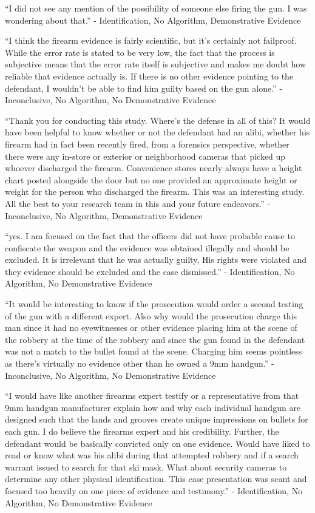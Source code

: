 \documentclass[print]{nuthesis}
\begin{document}
``I did not see any mention of the possibility of someone else firing the gun. I was wondering about that.'' - Identification, No Algorithm, Demonstrative Evidence

``I think the firearm evidence is fairly scientific, but it's certainly not failproof. While the error rate is stated to be very low, the fact that the process is subjective means that the error rate itself is subjective and makes me doubt how reliable that evidence actually is. If there is no other evidence pointing to the defendant, I wouldn't be able to find him guilty based on the gun alone.'' - Inconclusive, No Algorithm, No Demonstrative Evidence

``Thank you for conducting this study. Where's the defense in all of this? It would have been helpful to know whether or not the defendant had an alibi, whether his firearm had in fact been recently fired, from a forensics perspective, whether there were any in-store or exterior or neighborhood cameras that picked up whoever discharged the firearm. Convenience stores nearly always have a height chart posted alongside the door but no one provided an approximate height or weight for the person who discharged the firearm. This was an interesting study. All the best to your research team in this and your future endeavors.'' - Inconclusive, No Algorithm, Demonstrative Evidence

``yes. I am focused on the fact that the officers did not have probable cause to confiscate the weapon and the evidence was obtained illegally and should be excluded. It is irrelevant that he was actually guilty, His rights were violated and they evidence should be excluded and the case dismissed.'' - Identification, No Algorithm, No Demonstrative Evidence

``It would be interesting to know if the prosecution would order a second testing of the gun with a different expert. Also why would the prosecution charge this man since it had no eyewitnesses or other evidence placing him at the scene of the robbery at the time of the robbery and since the gun found in the defendant was not a match to the bullet found at the scene. Charging him seems pointless as there's virtually no evidence other than he owned a 9mm handgun.'' - Inconclusive, No Algorithm, No Demonstrative Evidence

``I would have like another firearms expert testify or a representative from that 9mm handgun manufacturer explain how and why each individual handgun are designed such that the lands and grooves create unique impressions on bullets for each gun. I do believe the firearms expert and his credibility. Further, the defendant would be basically convicted only on one evidence. Would have liked to read or know what was his alibi during that attempted robbery and if a search warrant issued to search for that ski mask. What about security cameras to determine any other physical identification. This case presentation was scant and focused too heavily on one piece of evidence and testimony.'' - Identification, No Algorithm, No Demonstrative Evidence
\end{document}
